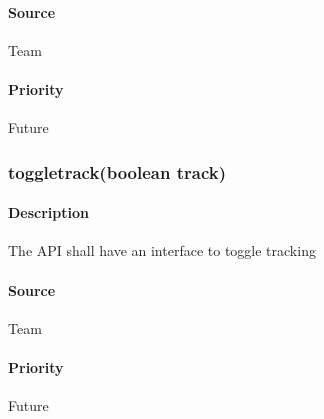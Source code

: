 \paragraph{Source}
Team
\paragraph{Priority}
Future
\subsubsection{toggletrack(boolean track)}
\paragraph{Description}
The API shall have an interface to toggle tracking
\paragraph{Source}
Team
\paragraph{Priority}
Future
